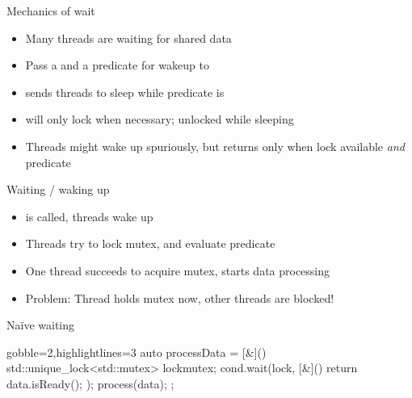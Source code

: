 \begin{frame}[fragile]
  \vspace{-1.2\baselineskip}
  \begin{overprint}
  \begin{block}{Mechanics of wait}
    \begin{itemize}
      \item Many threads are waiting for shared data
      \item Pass a  and a predicate for wakeup to 
      \item {} sends threads to sleep while predicate is 
      \item {} will only lock when necessary; unlocked while sleeping
      \item Threads might wake up spuriously, but  returns only when lock available \emph{and} predicate 
    \end{itemize}
  \end{block}
  \begin{block}{Waiting / waking up}
    \begin{itemize}
      \item {} is called, threads wake up
      \item Threads try to lock mutex, and evaluate predicate
      \item One thread succeeds to acquire mutex, starts data processing
      \item {\color{red} Problem}: Thread holds mutex now, other threads are blocked!
    \end{itemize}
  \end{block}
  \end{overprint}

  \begin{alertblock}{Na\"ive waiting}
    \begin{cppcode*}{gobble=2,highlightlines=3}
      auto processData = [&](){
        std::unique_lock<std::mutex> lock{mutex};
        cond.wait(lock, [&](){ return data.isReady(); });
        process(data);
      };
    \end{cppcode*}
  \end{alertblock}
\end{frame}

